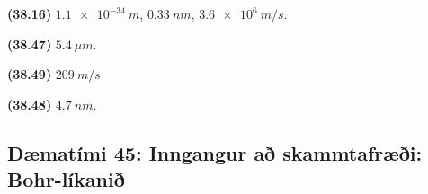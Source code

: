 \ifdefined \wholebook \else\documentclass[oneside]{book}\usepackage{EdlBook}\graphicspath{{figures/}}
\begin{document}
\begin{enumerate}[label = \textbf{(\alph*)}]

\end{enumerate}

\begin{tcolorbox}
\begin{enumerate*}[label = ]
  \item \textbf{(38.16)} $\SI{1.1e-34}{m}$, $\SI{0.33}{nm}$, $\SI{3.6e6}{m/s}$.
  \item \textbf{(38.47)} $\SI{5.4}{\mu m}$.
  \item \textbf{(38.49)} $\SI{209}{m/s}$
  \item \textbf{(38.48)} $\SI{4.7}{nm}$.
\end{enumerate*}
\end{tcolorbox}

\newpage

\subsection*{Dæmatími 45: Inngangur að skammtafræði: Bohr-líkanið}
\end{document}
